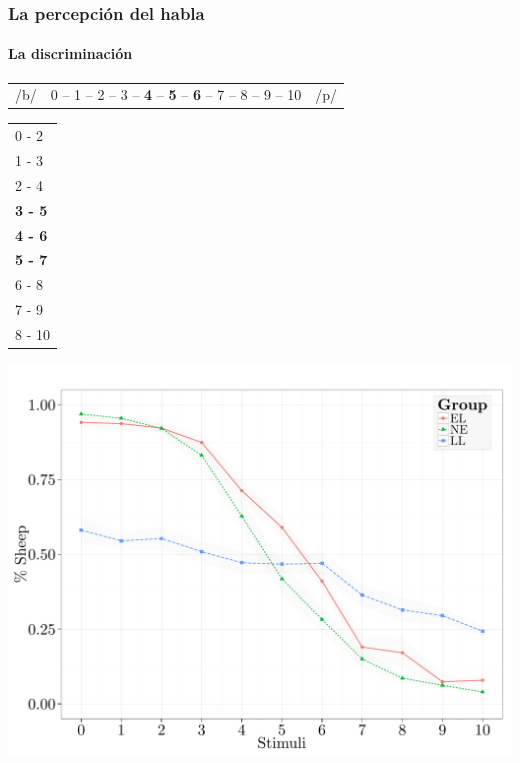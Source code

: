 \documentclass{beamer}
\begin{document}
\begin{frame}[t]
	\frametitle{La percepción del habla}
	\framesubtitle{La discriminación}
	
	\begin{center}
		\begin{tabular}{ccc}
		/b/ & 0 -- 1  -- 2  --  3 -- \textbf{4}  --  \textbf{5} -- \textbf{6}  -- 7 -- 8 --  9 -- 10 & /p/ \\
		\end{tabular}
	\end{center}

	\begin{center}
		\begin{tabular}{l}
		0 - 2 \\
		1 - 3 \\ 
		2 - 4 \\ 
		\textbf{3 - 5} \\ 
		\textbf{4 - 6} \\ 
		\textbf{5 - 7} \\ 
		6 - 8  \\
		7 - 9  \\
		8 - 10 \\
		\end{tabular}
	\end{center}
\end{frame}

\begin{frame}[plain]
	\begin{center}
		\includegraphics[width=\textwidth]{figures/spec_pro.pdf}
	\end{center}
\end{frame}
\end{document}
